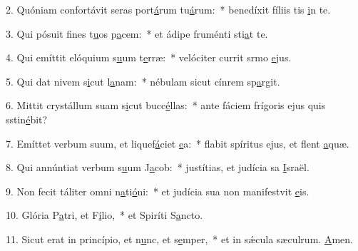 2. Quóniam confortávit seras port\uline{á}rum tu\uline{á}rum:~* benedíxit fíliis tis \uline{i}n te.\par 
3. Qui pósuit fines t\uline{u}os p\uline{a}cem:~* et ádipe fruménti sti\uline{a}t te.\par 
4. Qui emíttit elóquium s\uline{u}um t\uline{e}rræ:~* velóciter currit srmo \uline{e}jus.\par 
5. Qui dat nivem s\uline{i}cut l\uline{a}nam:~* nébulam sicut cínrem sp\uline{a}rgit.\par 
6. Mittit crystállum suam s\uline{i}cut bucc\uline{é}llas:~* ante fáciem frígoris ejus quis sstin\uline{é}bit?\par 
7. Emíttet verbum suum, et liquef\uline{á}ciet \uline{e}a:~* flabit spíritus ejus, et flent \uline{a}quæ.\par 
8. Qui annúntiat verbum s\uline{u}um J\uline{a}cob:~* justítias, et judícia sa \uline{I}sraël.\par 
9. Non fecit táliter omni n\uline{a}ti\uline{ó}ni:~* et judícia sua non manifestvit \uline{e}is.\par 
10. Glória P\uline{a}tri, et F\uline{í}lio,~* et Spiríti S\uline{a}ncto.\par 
11. Sicut erat in princípio, et n\uline{u}nc, et s\uline{e}mper,~* et in sǽcula sæculrum. \uline{A}men.\par 
